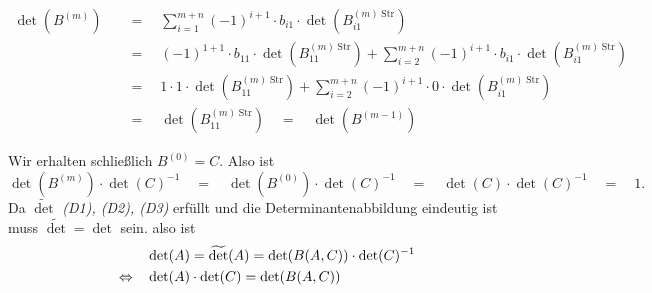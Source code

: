 \documentclass{article}
\newcommand{\equ}{\mathbb{\Leftrightarrow}}
\newcommand{\eq}{\mathbb{\quad = \quad}}
\newcommand{\movs}[2]{\overset{\text{\tiny $#1$}}{\quad #2 \quad}}
\begin{document}
\begin{align*}
  \det(B^{(m)})
   & \eq
  \sum_{i=1}^{m+n} (-1)^{i+1} \cdot b_{i1} \cdot \det(B^{(m)\;\text{Str}}_{i1})                                                                \\
   & \eq
  (-1)^{1+1} \cdot b_{11} \cdot \det(B^{(m)\;\text{Str}}_{11}) + \sum_{i=2}^{m+n} (-1)^{i+1} \cdot b_{i1} \cdot \det(B^{(m)\;\text{Str}}_{i1}) \\
   & \eq
  1 \cdot 1 \cdot \det(B^{(m)\;\text{Str}}_{11}) + \sum_{i=2}^{m+n} (-1)^{i+1} \cdot 0 \cdot \det(B^{(m)\;\text{Str}}_{i1})                    \\
   & \eq
  \det(B^{(m)\;\text{Str}}_{11}) \quad = \quad \det(B^{(m-1)})
\end{align*}




Wir erhalten schließlich
$B^{(0)} = C$.
Also ist
$$\det(B^{(m)}) \cdot \det(C)^{-1}
  \eq \det(B^{(0)}) \cdot \det(C)^{-1}
  \eq \det(C) \cdot \det(C)^{-1}
  \eq 1.$$
Da
$\widetilde{\det}$
\textit{(D1), (D2), (D3)}
erfüllt und die Determinantenabbildung eindeutig ist muss
$\widetilde{\det} = \det$ sein.
also ist
\begin{align*}
   & \det(A) = \widetilde{\det}(A) = \det(B(A, C)) \cdot \det(C)^{-1} \\
  \movs{}{\equ}
   & \det(A) \cdot \det(C) = \det(B(A, C))
\end{align*}
\end{document}
